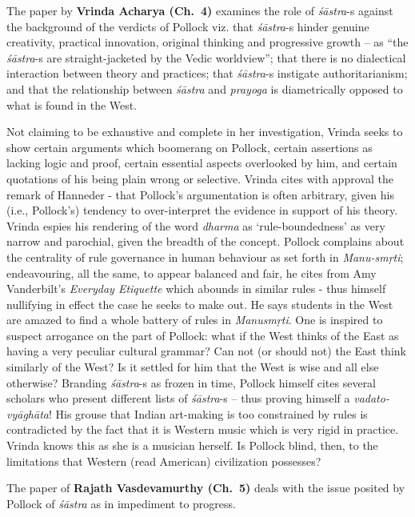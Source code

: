 The paper by {\bf Vrinda Acharya (Ch.~4)} examines the role of \hbox{{\sl śāstra}-s} against the background of the verdicts of Pollock viz. that {\sl śāstra}-s hinder genuine creativity, practical innovation, original thinking and progressive growth -- as “the {\sl śāstra}-s are straight-jacketed by the Vedic worldview”; that there is no dialectical interaction between theory and practices; that {\sl śāstra}-s instigate authoritarianism; and that the relationship between {\sl śāstra} and {\sl prayoga} is diametrically opposed to what is found in the West.

Not claiming to be exhaustive and complete in her investigation, Vrinda seeks to show certain arguments which boomerang on Pollock, certain assertions as lacking logic and proof, certain essential aspects overlooked by him, and certain quotations of his being plain wrong or selective. Vrinda cites with approval the remark of Hanneder - that Pollock’s argumentation is often arbitrary, given his (i.e., Pollock's) tendency to over-interpret the evidence in support of his theory. Vrinda espies his rendering of the word {\sl dharma} as ‘rule-boundedness’ as very narrow and parochial, given the breadth of the concept. Pollock complains about the centrality of rule governance in human behaviour as set forth in {\sl Manu-smṛti}; endeavouring, all the same, to appear balanced and fair, he cites from Amy Vanderbilt’s {\sl Everyday Etiquette} which abounds in similar rules - thus himself nullifying in effect the case he seeks to make out. He says students in the West are amazed to find a whole battery of rules in {\sl Manusmṛti}. One is inspired to suspect arrogance on the part of Pollock: what if the West thinks of the East as having a very peculiar cultural grammar? Can not (or should not) the East think similarly of the West? Is it settled for him that the West is wise and all else otherwise? Branding {\sl śāstra}-s as frozen in time, Pollock himself cites several scholars who present different lists of {\sl śāstra}-s -- thus proving himself a {\sl vadato-vyāghāta}! His grouse that Indian art-making is too constrained by rules is contradicted by the fact that it is Western music which is very rigid in practice. Vrinda knows this as she is a musician herself. Is Pollock blind, then, to the limitations that Western (read American) civilization possesses?
\vskip 8pt

The paper of {\bf Rajath Vasdevamurthy (Ch.~5)} deals with the issue posited by Pollock  of {\sl śāstra} as in impediment to progress.


